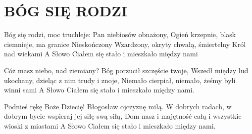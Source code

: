 \documentclass[../../../songbook.tex]{subfiles}
\begin{document}
\TabPositions{10cm} %
\section*{BÓG SIĘ RODZI}
{}
\vspace{0.5cm}
Bóg się rodzi, moc truchleje: Pan niebiosów obnażony,	      \newline	 
Ogień krzepnie, blask ciemnieje, ma granice Nieskończony  	  \newline
Wzardzony, okryty chwałą, śmiertelny Król nad wiekami	      \newline	 
A Słowo Ciałem się stało i mieszkało między nami		      \newline	 

Cóż masz niebo, nad ziemiany? Bóg porzucił szczęście twoje, \newline
Wszedł między lud ukochany, dzieląc z nim trudy i znoje, \newline
Niemało cierpiał, niemało, żeśmy byli winni sami \newline
A Słowo Ciałem się stało i mieszkało między nami. \newline

Podnieś rękę Boże Dziecię! Błogosław ojczyznę miłą. \newline
W dobrych radach, w dobrym bycie wspieraj jej siłę swą siłą, \newline
Dom nasz i majętność całą i wszystkie wioski z miastami \newline
A Słowo Ciałem się stało i mieszkało między nami. \newline
\end{document}

